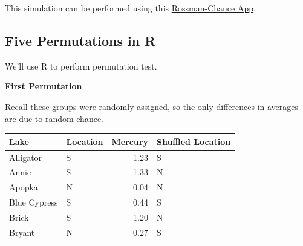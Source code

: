 \documentclass[
  letterpaper,
  DIV=11,
  numbers=noendperiod]{scrreprt}
\newenvironment{Shaded}{\begin{snugshade}}{\end{snugshade}}
\newcommand{\CommentTok}[1]{\textcolor[rgb]{0.37,0.37,0.37}{#1}}
\newcommand{\DecValTok}[1]{\textcolor[rgb]{0.68,0.00,0.00}{#1}}
\newcommand{\FunctionTok}[1]{\textcolor[rgb]{0.28,0.35,0.67}{#1}}
\newcommand{\NormalTok}[1]{\textcolor[rgb]{0.00,0.23,0.31}{#1}}
\newcommand{\OtherTok}[1]{\textcolor[rgb]{0.00,0.23,0.31}{#1}}
\newcommand{\SpecialCharTok}[1]{\textcolor[rgb]{0.37,0.37,0.37}{#1}}
\newcommand{\StringTok}[1]{\textcolor[rgb]{0.13,0.47,0.30}{#1}}
\begin{document}
This simulation can be performed using this
\href{http://www.rossmanchance.com/applets/2021/anovashuffle/AnovaShuffle.htm?hideExtras=2}{Rossman-Chance
App}.

\subsection{Five Permutations in R}\label{five-permutations-in-r}

We'll use R to perform permutation test.

\textbf{First Permutation}

Recall these groups were randomly assigned, so the only differences in
averages are due to random chance.

\begin{Shaded}
\end{Shaded}

\begin{Shaded}
\end{Shaded}

\begin{longtable}[]{@{}llrl@{}}
\toprule\noalign{}
Lake & Location & Mercury & Shuffled Location \\
\midrule\noalign{}
\endhead
\bottomrule\noalign{}
\endlastfoot
Alligator & S & 1.23 & S \\
Annie & S & 1.33 & N \\
Apopka & N & 0.04 & N \\
Blue Cypress & S & 0.44 & S \\
Brick & S & 1.20 & N \\
Bryant & N & 0.27 & S \\
\end{longtable}
\end{document}
